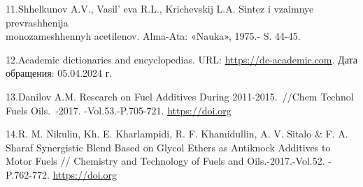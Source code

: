 \begin{references}
11.Shhelkunov A.V., Vasil' eva R.L., Krichevskij L.A.
Sintez i vzaimnye prevrashhenija \\monozameshhennyh acetilenov. Alma-Ata:
«Nauka», 1975.- S. 44-45.

12.Academic dictionaries and encyclopedias. URL:
\href{https://de-academic.com/dic.nsf/dewiki/411193}{https://de-academic.com}. Дата обращения:
05.04.2024 г.

13.Danilov A.M. Research on Fuel Additives During 2011-2015.~//Chem
Technol Fuels Oils.~-2017. -Vol.53.-P.705-721.
\href{https://doi.org/10.1007/s10553-017-0853-z}{https://doi.org}

14.R. M. Nikulin, Kh. E. Kharlampidi, R. F. Khamidullin, A. V. Sitalo \&
F. A. Sharaf Synergistic Blend Based on Glycol Ethers as Antiknock
Additives to Motor Fuels // Chemistry and Technology of Fuels and
Oils.-2017.-Vol.52. - P.762-772.
\href{https://doi.org/10.1007/s10553-017-0771-0}{https://doi.org}
\end{references}

